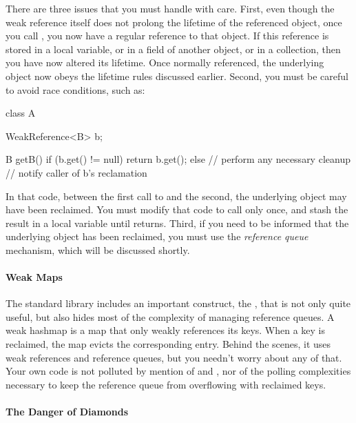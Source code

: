 There are three issues that you must handle with care. First, even though the
weak reference itself does not prolong the lifetime of the referenced object,
once you call , you now have a regular reference to that object. If
this reference is stored in a local variable, or in a field of another object, or
in a collection, then you have now altered its lifetime. Once normally
referenced, the underlying object now obeys the lifetime rules discussed earlier.
Second, you must be careful to avoid race conditions, such as:
\begin{shortlisting}
class A {
   WeakReference<B> b;
   
   B getB() {
      if (b.get() != null) {
         return b.get();
      } else {
         // perform any necessary cleanup
         // notify caller of b's reclamation
      }
   }
}
\end{shortlisting}
In that code, between the first call to  and the second, the
underlying object may have been reclaimed. You must modify that code to call
 only once, and stash the result in a local variable until
 returns. Third, if you need to be informed that the underlying object
has been reclaimed, you must use the \emph{reference queue} mechanism, which will
be discussed shortly.

\paragraph{Weak Maps}
\label{sec:weakhashmap}

The standard library includes an important construct, the ,
that is not only quite useful, but also hides most of the complexity of managing
reference queues. A weak hashmap is a map that only weakly references its keys.
When a key is reclaimed, the map evicts the corresponding entry. Behind the
scenes, it uses weak references and reference queues, but you needn't worry about
any of that. Your own code is not polluted by mention of 
and , nor of the polling complexities necessary to keep the
reference queue from overflowing with reclaimed keys.

\paragraph{The Danger of Diamonds}
\label{sec:strongweakdiamonds}

